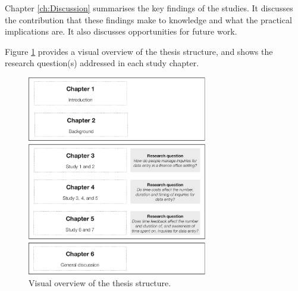 Chapter \ref{ch:Discussion} summarises the key findings of the studies. It discusses the contribution that these findings make to knowledge and what the practical implications are. It also discusses opportunities for future work. 

Figure \ref{fig:ch1-thesisoverview} provides a visual overview of the thesis structure, and shows the research question(s) addressed in each study chapter.

\begin{figure}
\centering
\includegraphics[width=0.7\textwidth]{images/ThesisOverview.pdf}
\caption{Visual overview of the thesis structure.}
\label{fig:ch1-thesisoverview}
\end{figure}

